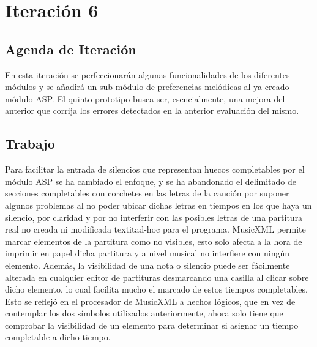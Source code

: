 \section{Iteración 6}
\subsection{Agenda de Iteración}
 En esta iteración se perfeccionarán algunas funcionalidades de los diferentes módulos y se añadirá un sub-módulo de preferencias melódicas al ya creado módulo ASP. El quinto prototipo busca ser, esencialmente, una mejora del anterior que corrija los errores detectados en la anterior evaluación del mismo.

\subsection{Trabajo}
Para facilitar la entrada de silencios que representan huecos completables por el módulo ASP se ha cambiado el enfoque, y se ha abandonado el delimitado de secciones completables con corchetes en las letras de la canción por suponer algunos problemas al no poder ubicar dichas letras en tiempos en los que haya un silencio, por claridad y por no interferir con las posibles letras de una partitura real no creada ni modificada textit{ad-hoc} para el programa. MusicXML permite marcar elementos de la partitura como no visibles, esto solo afecta a la hora de imprimir en papel dicha partitura y a nivel musical no interfiere con ningún elemento. Además, la visibilidad de una nota o silencio puede ser fácilmente alterada en cualquier editor de partituras desmarcando una casilla al clicar sobre dicho elemento, lo cual facilita mucho el marcado de estos tiempos completables. Esto se reflejó en el procesador de MusicXML a hechos lógicos, que en vez de contemplar los dos símbolos utilizados anteriormente, ahora solo tiene que comprobar la visibilidad de un elemento para determinar si asignar un tiempo completable a dicho tiempo.

